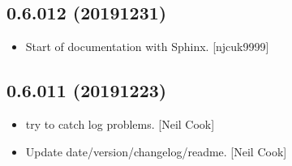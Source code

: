 \documentclass[a4paper,10pt,english]{report}
\begin{document}
\subsection{0.6.012 (2019\sphinxhyphen{}12\sphinxhyphen{}31)}
\label{\detokenize{misc/changelog:id25}}\begin{itemize}
\item {} 
Start of documentation with Sphinx. {[}njcuk9999{]}

\end{itemize}


\subsection{0.6.011 (2019\sphinxhyphen{}12\sphinxhyphen{}23)}
\label{\detokenize{misc/changelog:id26}}\begin{itemize}
\item {} 
 \sphinxhyphen{} try to catch log problems. {[}Neil Cook{]}

\item {} 
Update date/version/changelog/readme. {[}Neil Cook{]}

\end{itemize}
\end{document}
